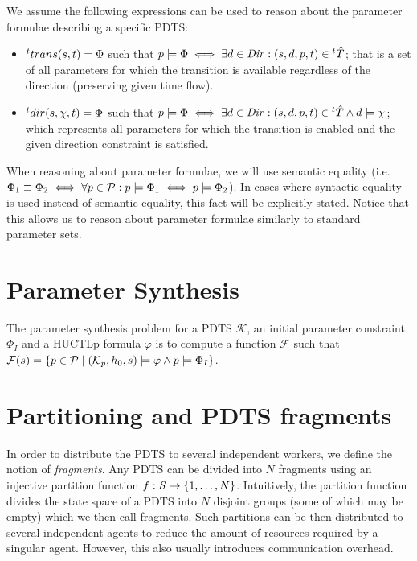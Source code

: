 We assume the following expressions can be used to reason about the parameter formulae describing a specific \ac{PDTS}:

\begin{itemize}
	\item ${}^{t}trans(s,t) = \Phi$ such that $p \models \Phi \iff \exists d \in \mathit{Dir} : (s, d, p, t) \in {}^{t}\hat{T}$; that is a set of all parameters for which the transition is available regardless of the direction (preserving given time flow).
	\item ${}^{t}dir(s, \chi ,t) = \Phi$ such that $p \models \Phi \iff \exists d \in \mathit{Dir} : (s, d, p, t) \in {}^{t}\hat{T} \land d \models \chi$; which represents all parameters for which the transition is enabled and the given direction constraint is satisfied.
\end{itemize}

When reasoning about parameter formulae, we will use semantic equality (i.e. $\Phi_1 \equiv \Phi_2 \iff \forall p \in \mathcal{P} : p \models \Phi_1 \iff p \models \Phi_2$). In cases where syntactic equality is used instead of semantic equality, this fact will be explicitly stated. Notice that this allows us to reason about parameter formulae similarly to standard parameter sets.

\section{Parameter Synthesis}

The parameter synthesis problem for a \ac{PDTS} $\mathcal{K}$, an initial parameter constraint $\Phi_I$ and a \ac{HUCTLp} formula $\varphi$ is to compute a function $\mathcal{F}$ such that $\mathcal{F}(s) = \{p \in \mathcal{P} \mid (\mathcal{K}_p, h_0, s) \models \varphi \land p \models \Phi_I \}$.

\section{Partitioning and \ac{PDTS} fragments}

In order to distribute the \ac{PDTS} to several independent workers, we define the notion of \emph{fragments}. Any \ac{PDTS} can be divided into $N$ fragments using an injective partition function $f: \mathit{S} \to \{1, \ldots, N \}$. Intuitively, the partition function divides the state space of a \ac{PDTS} into $N$ disjoint groups (some of which may be empty) which we then call fragments. Such partitions can be then distributed to several independent agents to reduce the amount of resources required by a singular agent. However, this also usually introduces communication overhead. 

